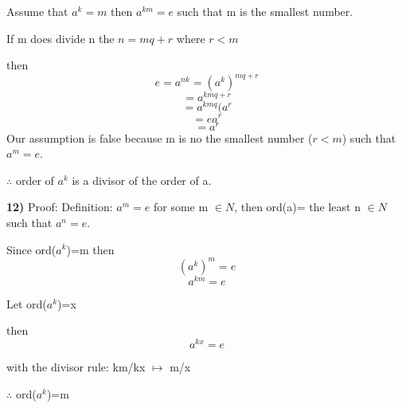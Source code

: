 \documentclass{article}
\begin{document}
Assume that $a^{k}=m$
then $a^{km}=e$ such that m is the smallest number. 

If m does divide n 
the $n=mq+r$ where $r<m$



then $$e=a^{nk}=(a^{k})^{mq+r}$$
$$=a^{kmq+r}$$
$$=a^{kmq}(a^{r}$$
$$=ea^{r}$$
$$=a^r$$
Our assumption is false because m is no the smallest number ($r<m$) such that $a^{m}=e$.

\medskip

$\therefore$ order of $a^{k}$ is a divisor of the order of a.

\newpage

\textbf{12)} Proof: Definition: $a^{m}=e$ for some m $\in N$, then ord(a)= the least n $\in N$ such that $a^{n}=e$.

\medskip

Since ord($a^{k}$)=m
then $$(a^{k})^{m}=e$$
$$a^{km}=e$$

 Let ord($a^{k}$)=x
 
 \medskip
 
 then $$a^{kx}=e$$
 
 \medskip
 
with the divisor rule: km/kx		$\mapsto$ m/x
 
 
 \medskip
 $\therefore$ ord($a^{k}$)=m


























 
 
\end{document}
